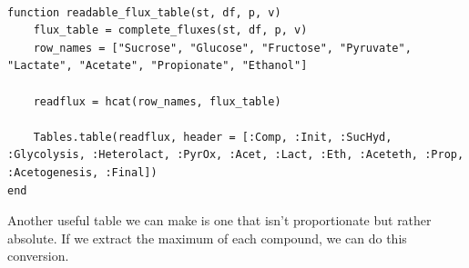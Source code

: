 \documentclass[11pt]{article}
\begin{document}
\begin{verbatim}

function readable_flux_table(st, df, p, v)
    flux_table = complete_fluxes(st, df, p, v)
    row_names = ["Sucrose", "Glucose", "Fructose", "Pyruvate", "Lactate", "Acetate", "Propionate", "Ethanol"]

    readflux = hcat(row_names, flux_table)

    Tables.table(readflux, header = [:Comp, :Init, :SucHyd, :Glycolysis, :Heterolact, :PyrOx, :Acet, :Lact, :Eth, :Aceteth, :Prop, :Acetogenesis, :Final])
end

\end{verbatim}

Another useful table we can make is one that isn't proportionate but rather absolute. If we extract the maximum of each compound, we can do this conversion.
\end{document}
